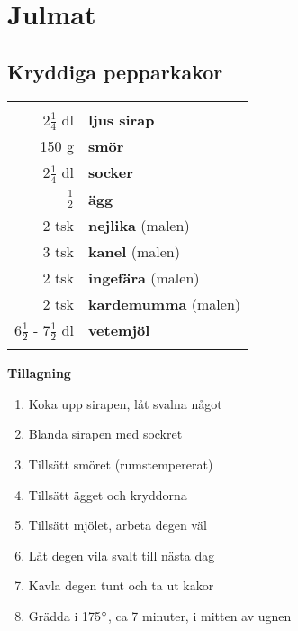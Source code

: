 
\section{Julmat}

\clearpage

\subsection{Kryddiga pepparkakor}

\begin{table}[H]
	\begin{tabular}{rl}
	\hline
	&\\
		2$\frac{1}{4}$ dl & \textbf{ljus sirap} \\
		150 g & \textbf{smör} \\
		2$\frac{1}{4}$ dl & \textbf{socker} \\
		$\frac{1}{2}$ & \textbf{ägg} \\
		2 tsk & \textbf{nejlika} (malen) \\
		3 tsk & \textbf{kanel} (malen) \\
		2 tsk & \textbf{ingefära} (malen) \\
		2 tsk & \textbf{kardemumma} (malen) \\
		6$\frac{1}{2}$ - 7$\frac{1}{2}$ dl & \textbf{vetemjöl} \\
	&\\
	\hline
	\end{tabular}
\end{table}

\begin{multicols*}{2}

\noindent \textbf{Tillagning}
\begin{enumerate}
	\itemsep0cm
	\item Koka upp sirapen, låt svalna något
	\item Blanda sirapen med sockret
	\item Tillsätt smöret (rumstempererat)
	\item Tillsätt ägget och kryddorna
	\item Tillsätt mjölet, arbeta degen väl
	\item Låt degen vila svalt till nästa dag
	\item Kavla degen tunt och ta ut kakor
	\item Grädda i 175$\degree$, ca 7 minuter, i mitten av ugnen
\end{enumerate}

\end{multicols*}

